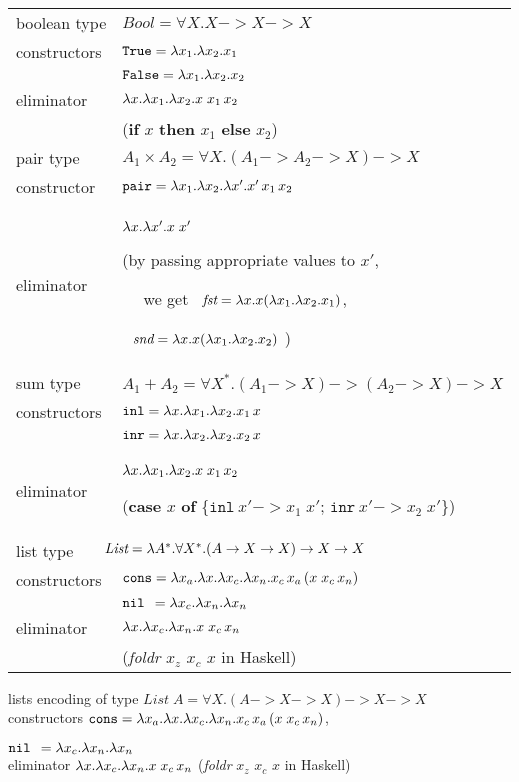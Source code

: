 \begin{tabular}{lp{60mm}}
	\hline
boolean type	& $\!\!\!\!\textit{Bool} = \forall X.X -> X -> X$ \\
constructors		& $\mathtt{True} = \lambda x_1.\lambda x_2. x_1$ \\
            &$\mathtt{False} = \lambda x_1.\lambda x_2. x_2$ \\
eliminator		& $\lambda x.\lambda x_1. \lambda x_2. x\;x_1\,x_2$ \\
	      &(\textbf{if} $x$ \textbf{then} $x_1$ \textbf{else} $x_2$)
	\\\hline
pair type & $\!\!\!\!\!\!\!\!A_1\times A_2 = \forall X. (A_1 -> A_2 -> X) -> X$ \\
constructor		& $\mathtt{pair} = \lambda x_1.\lambda x_2.\lambda x'.x'\,x_1\,x_2$ \\
eliminator		& $\lambda x.\lambda x'.x\;x'$ \par
			(by passing appropriate values to $x'$, \par ~~ we get
			~$\textit{fst} = \lambda x.x(\lambda x_1.\lambda x_2.x_1)$,\par \qquad
			\quad
			~$\,\textit{snd} = \lambda x.x(\lambda x_1.\lambda x_2.x_2)$ )
	\\\hline

sum type & $\!\!\!\!\!\!\!\!A_1+A_2 = \forall X^{*}. (A_1 -> X) -> (A_2 -> X) -> X$ \\
constructors		& $\mathtt{inl} = \lambda x. \lambda x_1. \lambda x_2 . x_1\,x$\\
	      &		$\mathtt{inr} = \lambda x. \lambda x_2. \lambda x_2 . x_2\,x$ \\
eliminator		& $\lambda x.\lambda x_1. \lambda x_2. x\;x_1\,x_2$ \par
			(\textbf{case} $x$ \textbf{of}
				\{$\mathtt{inl}~x' -> x_1\;x'$;
				  $\mathtt{inr}~x' -> x_2\;x'$\})
	\\\hline
list type & $\!\!\!\!\!\!\!\!\textit{List}=\l A^{*}.\forall X^{*}. (A -> X -> X) -> X -> X$ \\
constructors		& $\mathtt{cons} = \lambda x_a.\lambda x.\lambda x_c.\lambda x_n. x_c\,x_a\,(x\;x_c\,x_n)$\\
       &	$\mathtt{nil}\;\, = \lambda x_c.\lambda x_n.\lambda x_n$ \\
eliminator		& $\lambda x.\lambda x_c. \lambda x_n.x\;x_c\,x_n$ \\
	    &		(\textit{foldr} $x_z$ $x_c$ $x$ in Haskell)
	\\\hline
\end{tabular}


lists
encoding of type	$\textit{List}\;A = \forall X. (A -> X -> X) -> X -> X$ \\
constructors		$\mathtt{cons} = \lambda x_a.\lambda x.\lambda x_c.\lambda x_n. x_c\,x_a\,(x\;x_c\,x_n)$,\par
			$\mathtt{nil}\;\, = \lambda x_c.\lambda x_n.\lambda x_n$ \\
eliminator		$\lambda x.\lambda x_c. \lambda x_n.x\;x_c\,x_n$ \quad
			(\textit{foldr} $x_z$ $x_c$ $x$ in Haskell)

